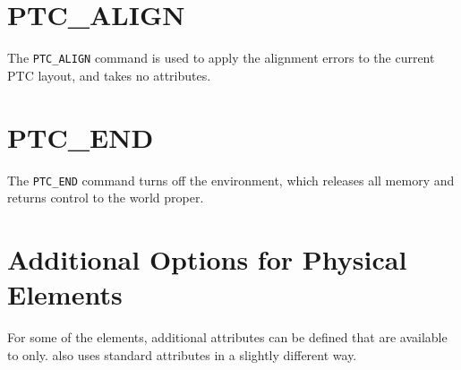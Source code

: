        

\section{PTC\_ALIGN}
\label{sec:ptc-align}

The {\tt PTC\_ALIGN} command is used to apply the \madx alignment
errors to the current PTC layout, and takes no attributes.



\section{PTC\_END}
\label{sec:ptc-end}

The {\tt PTC\_END} command turns off the \ptc environment,
which releases all memory and returns control to the \madx world proper.



\section{Additional Options for Physical Elements}
\label{sec:add-option-PTC}

For some of the \madx elements, additional attributes can be defined
that are available to \ptc only. \ptc also uses standard \madx
attributes in a slightly different way.


